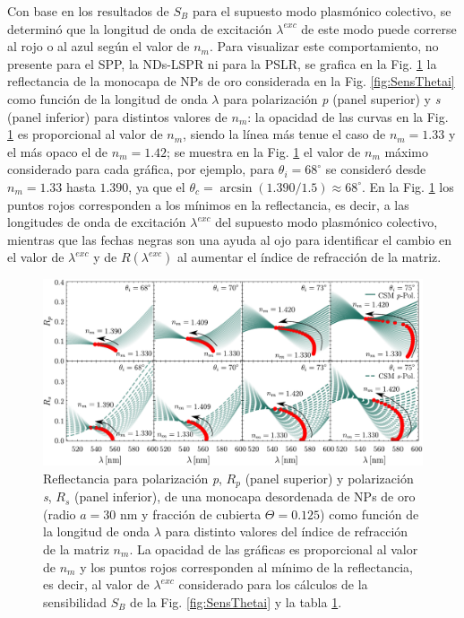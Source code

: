 Con base en los resultados de $S_B$ para el supuesto modo  plasmónico colectivo, se determinó que la longitud de onda de excitación $\lambda^{exc}$ de este modo puede correrse al rojo o al azul según el valor de $n_m$. Para visualizar este comportamiento, no presente para el SPP, la NDs-LSPR ni para la PSLR, se grafica en la Fig. \ref{fig:SensRpRs} la reflectancia de la monocapa de NPs de oro considerada en la Fig. \ref{fig:SensThetai} como función de la longitud de onda $\lambda$ para polarización \emph{p} (panel superior) y \emph{s} (panel inferior) para distintos valores de $n_m$: la opacidad de las curvas en la Fig. \ref{fig:SensRpRs} es proporcional al valor de $n_m$, siendo la línea más tenue el caso de $n_m=1.33$ y el más opaco el de $n_m=1.42$; se muestra en la Fig. \ref{fig:SensRpRs} el valor de $n_m$ máximo considerado para cada gráfica, por ejemplo, para $\theta_i=68^\circ$ se consideró desde $n_m=1.33$ hasta $1.390$, ya que el $\theta_c=\arcsin(1.390/1.5)\approx 68^\circ$. En la Fig. \ref{fig:SensRpRs} los puntos rojos corresponden a los mínimos en la reflectancia, es decir, a las longitudes de onda de excitación $\lambda^{exc}$ del supuesto modo plasmónico colectivo, mientras que las fechas negras son una ayuda al ojo para identificar el cambio en el valor de $\lambda^{exc}$ y de $R(\lambda^{exc})$ al aumentar el índice de refracción de la matriz.

\begin{figure}[h!]\centering
	\includegraphics[width=1\linewidth]{2-Resultados/figs/11-SPPCSM/2-RpRs}\vspace*{-.7em}%
\caption{Reflectancia para polarización \emph{p}, $R_p$ (panel superior) y polarización \emph{s}, $R_s$ (panel inferior), de una monocapa desordenada de NPs de oro (radio $a=30$ nm y fracción de cubierta $\Theta=0.125$)  como función de la longitud de onda $\lambda$ para distinto valores del  índice de refracción de la matriz $n_m$. La opacidad de las gráficas es proporcional al valor de $n_m$  y los puntos rojos corresponden al mínimo de la reflectancia, es decir, al valor de $\lambda^{exc}$ considerado para los cálculos de la sensibilidad $S_B$ de la Fig. \ref{fig:SensThetai} y la tabla \ref{fig:SensRpRs}.	
	}\label{fig:SensRpRs}
	\end{figure}	

